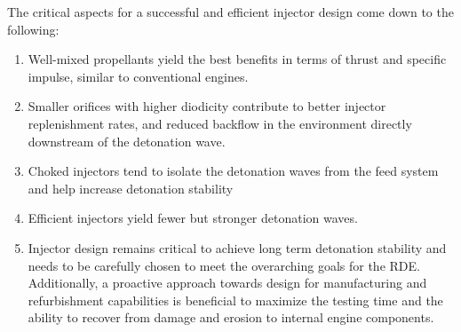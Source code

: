 \vspace{1em}
\noindent The critical aspects for a successful and efficient injector design come down to the following:

\begin{enumerate}[label=(\alph*)]
    \item Well-mixed propellants yield the best benefits in terms of thrust and specific impulse, similar to conventional engines.
    \item Smaller orifices with higher diodicity contribute to better injector replenishment rates, and reduced backflow in the environment directly downstream of the detonation wave.
    \item Choked injectors tend to isolate the detonation waves from the feed system and help increase detonation stability
    \item Efficient injectors yield fewer but stronger detonation waves.
    \item Injector design remains critical to achieve long term detonation stability and needs to be carefully chosen to meet the overarching goals for the RDE. Additionally, a proactive approach towards design for manufacturing and refurbishment capabilities is beneficial to maximize the testing time and the ability to recover from damage and erosion to internal engine components.
\end{enumerate}